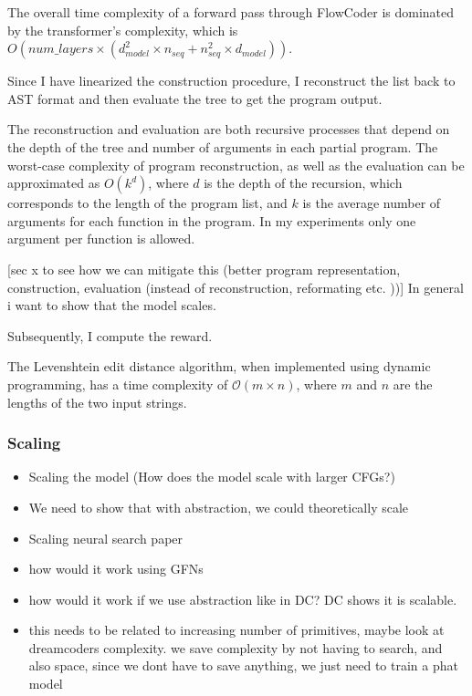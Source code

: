 The overall time complexity of a forward pass through FlowCoder is dominated by the transformer's complexity, which is \(O(num\_layers \times (d_{model}^2 \times n_{seq} + n_{seq}^2 \times d_{model}))\).

Since I have linearized the construction procedure, I reconstruct the list back to AST format and then evaluate the tree to get the program output.

The reconstruction and evaluation are both recursive processes that depend on the depth of the tree and number of arguments in each partial program. 
The worst-case complexity of program reconstruction, as well as the evaluation can be approximated as \(O(k^d)\), where \(d\) is the depth of the recursion, which corresponds to the length of the program list, and \(k\) is the average number of arguments for each function in the program. In my experiments only one argument per function is allowed.

[sec x to see how we can mitigate this (better program representation, construction, evaluation (instead of reconstruction, reformating etc. ))]
In general i want to show that the model scales. 

Subsequently, I compute the reward.

The Levenshtein edit distance algorithm, when implemented using dynamic programming, has a time complexity of 
$\mathcal{O}(m \times n)$, where $m$ and  $n$ are the lengths of the two input strings.
\subsubsection{Scaling}
\begin{itemize}
    \item Scaling the model (How does the model scale with larger CFGs?)
    \item We need to show that with abstraction, we could theoretically scale
    \item Scaling neural search paper
    \item how would it work using GFNs
    \item how would it work if we use abstraction like in DC? DC shows it is scalable.
    \item this needs to be related to increasing number of primitives, maybe look at dreamcoders complexity. we save complexity by not having to search, and also space, since we dont have to save anything, we just need to train a phat model
\end{itemize}
    


